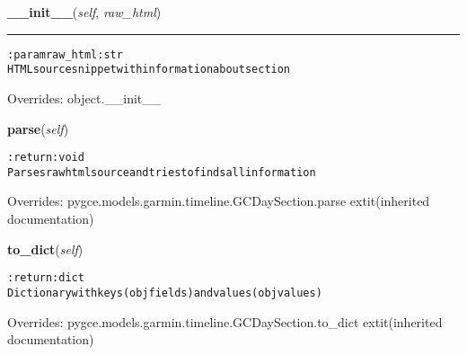     \vspace{0.5ex}

\hspace{.8\funcindent}\begin{boxedminipage}{\funcwidth}

    \raggedright \textbf{\_\_init\_\_}(\textit{self}, \textit{raw\_html})

    \vspace{-1.5ex}

    \rule{\textwidth}{0.5\fboxrule}
\setlength{\parskip}{2ex}
\begin{alltt}

:param raw\_html: str
    HTML source snippet with information about section
\end{alltt}

\setlength{\parskip}{1ex}
      Overrides: object.\_\_init\_\_

    \end{boxedminipage}

    \vspace{0.5ex}

\hspace{.8\funcindent}\begin{boxedminipage}{\funcwidth}

    \raggedright \textbf{parse}(\textit{self})

\setlength{\parskip}{2ex}
\begin{alltt}

:return: void
    Parses raw html source and tries to finds all information
\end{alltt}

\setlength{\parskip}{1ex}
      Overrides: pygce.models.garmin.timeline.GCDaySection.parse 	extit{(inherited documentation)}

    \end{boxedminipage}

    \vspace{0.5ex}

\hspace{.8\funcindent}\begin{boxedminipage}{\funcwidth}

    \raggedright \textbf{to\_dict}(\textit{self})

\setlength{\parskip}{2ex}
\begin{alltt}

:return: dict
    Dictionary with keys (obj fields) and values (obj values)
\end{alltt}

\setlength{\parskip}{1ex}
      Overrides: pygce.models.garmin.timeline.GCDaySection.to\_dict 	extit{(inherited documentation)}

    \end{boxedminipage}


